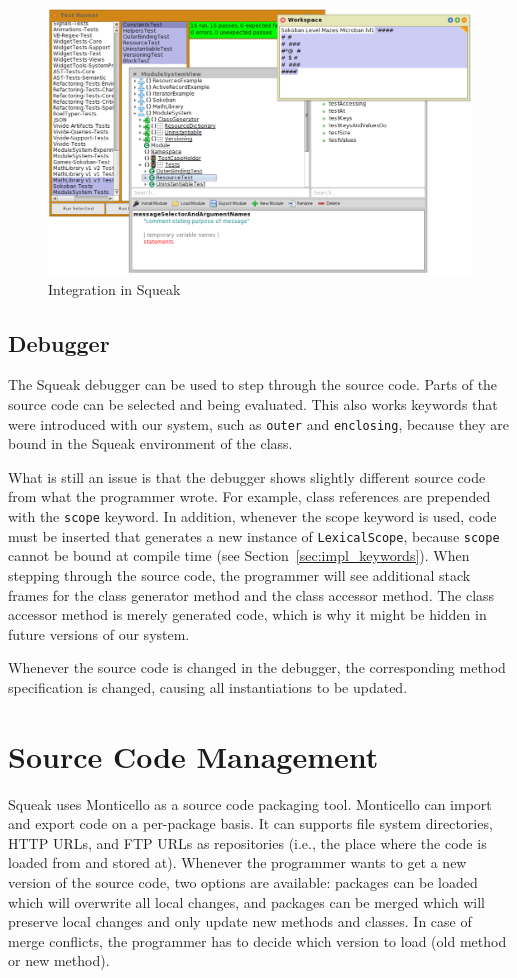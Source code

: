\begin{figure}[!htp]
	\centering
	\includegraphics[width=\textwidth]{screenshot_integration.png}
	\caption{Integration in Squeak}
	\label{fig:impl_integration}
\end{figure}

\subsection{Debugger}
The Squeak debugger can be used to step through the source code. Parts of the source code can be selected and being evaluated. This also works keywords that were introduced with our system, such as \texttt{outer} and \texttt{enclosing}, because they are bound in the Squeak environment of the class.

What is still an issue is that the debugger shows slightly different source code from what the programmer wrote. For example, class references are prepended with the \texttt{scope} keyword. In addition, whenever the scope keyword is used, code must be inserted that generates a new instance of \texttt{LexicalScope}, because \texttt{scope} cannot be bound at compile time (see Section~\ref{sec:impl_keywords}). When stepping through the source code, the programmer will see additional stack frames for the class generator method and the class accessor method. The class accessor method is merely generated code, which is why it might be hidden in future versions of our system.

Whenever the source code is changed in the debugger, the corresponding method specification is changed, causing all instantiations to be updated.

\section{Source Code Management}
Squeak uses Monticello as a source code packaging tool. Monticello can import and export code on a per-package basis. It can supports file system directories, HTTP URLs, and FTP URLs as repositories (i.e., the place where the code is loaded from and stored at). Whenever the programmer wants to get a new version of the source code, two options are available: packages can be loaded which will overwrite all local changes, and packages can be merged which will preserve local changes and only update new methods and classes. In case of merge conflicts, the programmer has to decide which version to load (old method or new method).

